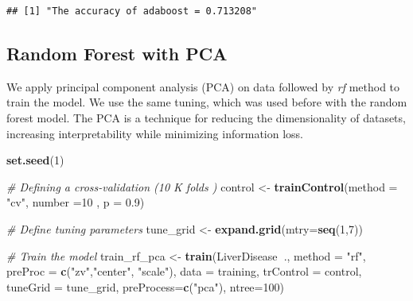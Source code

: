 \documentclass[]{article}
\newenvironment{Shaded}{\begin{snugshade}}{\end{snugshade}}
\newcommand{\CommentTok}[1]{\textcolor[rgb]{0.56,0.35,0.01}{\textit{#1}}}
\newcommand{\DataTypeTok}[1]{\textcolor[rgb]{0.13,0.29,0.53}{#1}}
\newcommand{\DecValTok}[1]{\textcolor[rgb]{0.00,0.00,0.81}{#1}}
\newcommand{\FloatTok}[1]{\textcolor[rgb]{0.00,0.00,0.81}{#1}}
\newcommand{\KeywordTok}[1]{\textcolor[rgb]{0.13,0.29,0.53}{\textbf{#1}}}
\newcommand{\NormalTok}[1]{#1}
\newcommand{\OperatorTok}[1]{\textcolor[rgb]{0.81,0.36,0.00}{\textbf{#1}}}
\newcommand{\StringTok}[1]{\textcolor[rgb]{0.31,0.60,0.02}{#1}}
\begin{document}
\begin{verbatim}
## [1] "The accuracy of adaboost = 0.713208"
\end{verbatim}

\begin{Shaded}
\end{Shaded}

\subsection{Random Forest with PCA}
We apply principal component analysis (PCA) on data followed by \emph{rf} method to train the model. We use the same tuning, which was used before with the random forest model.
The PCA is a technique for reducing the dimensionality of datasets, increasing interpretability while minimizing information loss.
\begin{Shaded}
\begin{Highlighting}[]
\KeywordTok{set.seed}\NormalTok{(}\DecValTok{1}\NormalTok{)}

\CommentTok{# Defining a cross-validation (10 K folds )}
\NormalTok{control <-}\StringTok{ }\KeywordTok{trainControl}\NormalTok{(}\DataTypeTok{method =} \StringTok{"cv"}\NormalTok{, }\DataTypeTok{number =}\DecValTok{10}\NormalTok{ , }\DataTypeTok{p =} \FloatTok{0.9}\NormalTok{)}

\CommentTok{# Define tuning parameters}
\NormalTok{tune_grid <-}\StringTok{ }\KeywordTok{expand.grid}\NormalTok{(}\DataTypeTok{mtry=}\KeywordTok{seq}\NormalTok{(}\DecValTok{1}\NormalTok{,}\DecValTok{7}\NormalTok{))}

\CommentTok{# Train the model}
\NormalTok{train_rf_pca <-}\StringTok{ }\KeywordTok{train}\NormalTok{(LiverDisease}\OperatorTok{~}\NormalTok{.,}
                     \DataTypeTok{method =} \StringTok{"rf"}\NormalTok{,}
                     \DataTypeTok{preProc =} \KeywordTok{c}\NormalTok{(}\StringTok{"zv"}\NormalTok{,}\StringTok{"center"}\NormalTok{, }\StringTok{"scale"}\NormalTok{),}
                     \DataTypeTok{data =}\NormalTok{ training,}
                     \DataTypeTok{trControl =}\NormalTok{ control,}
                     \DataTypeTok{tuneGrid =}\NormalTok{ tune_grid,}
                     \DataTypeTok{preProcess=}\KeywordTok{c}\NormalTok{(}\StringTok{"pca"}\NormalTok{),}
                     \DataTypeTok{ntree=}\DecValTok{100}\NormalTok{)}
\end{Highlighting}
\end{Shaded}
\end{document}
